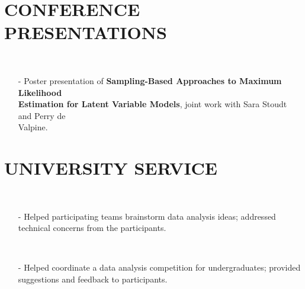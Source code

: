 \documentclass{res}
\begin{document}
\begin{resume}
\section{CONFERENCE PRESENTATIONS}
  \\ 
    \begin{itemize}\setlength\itemsep{0em}
    \item[-] Poster presentation of \textbf{Sampling-Based Approaches to Maximum Likelihood \\Estimation for Latent Variable Models}, joint work with Sara Stoudt and Perry de \\Valpine.
    \end{itemize}

\section{UNIVERSITY SERVICE}   
  \\ 
    \begin{itemize}\setlength\itemsep{0em}
    \item[-] Helped participating teams brainstorm data analysis ideas; addressed technical concerns from the participants.
    \end{itemize}

  \\ 
    \begin{itemize}\setlength\itemsep{0em}
    \item[-] Helped coordinate a data analysis competition for undergraduates; provided suggestions and feedback to participants.
    \end{itemize}

            

\end{resume}
\end{document}
